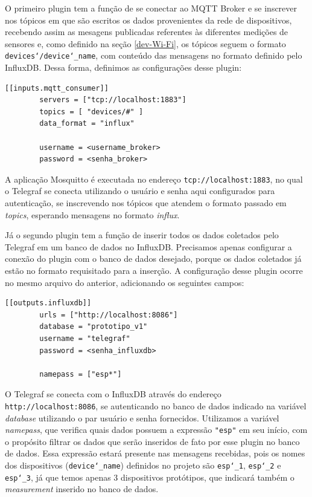 \documentclass[../monografia.tex]{subfiles}
\begin{document}
O primeiro plugin tem a função de se conectar ao MQTT Broker e se inscrever nos tópicos em que são escritos os dados provenientes da rede de dispositivos, recebendo assim as mesagens publicadas referentes às diferentes medições de sensores e, como definido na seção \ref{dev-Wi-Fi}, os tópicos seguem o formato \texttt{devices\char`/device\char`_name}, com conteúdo das mensagens no formato definido pelo InfluxDB. Dessa forma, definimos as configurações desse plugin:

\begin{lstlisting}[basicstyle=\small]
	[[inputs.mqtt_consumer]]
		servers = ["tcp://localhost:1883"]
		topics = [ "devices/#" ]
		data_format = "influx"

		username = <username_broker> 
		password = <senha_broker>
\end{lstlisting}

A aplicação Mosquitto é executada no endereço \texttt{tcp://localhost:1883}, no qual o Telegraf se conecta utilizando o usuário e senha aqui configurados para autenticação, se inscrevendo nos tópicos que atendem o formato passado em \textit{topics}, esperando mensagens no formato \textit{influx}. 

Já o segundo plugin tem a função de inserir todos os dados coletados pelo Telegraf em um banco de dados no InfluxDB. Precisamos apenas configurar a conexão do plugin com o banco de dados desejado, porque os dados coletados já estão no formato requisitado para a inserção. A configuração desse plugin ocorre no mesmo arquivo do anterior, adicionando os seguintes campos:

\begin{lstlisting}[basicstyle=\small]
	[[outputs.influxdb]]
		urls = ["http://localhost:8086"]
		database = "prototipo_v1"
		username = "telegraf"
		password = <senha_influxdb>

		namepass = ["esp*"]
\end{lstlisting}

O Telegraf se conecta com o InfluxDB através do endereço \texttt{http://localhost:8086}, se autenticando no banco de dados indicado na variável \textit{database} utilizando o par usuário e senha fornecidos. Utilizamos a variável \textit{namepass}, que verifica quais dados possuem a expressão \texttt{"esp"} em seu início, com o propósito filtrar os dados que serão inseridos de fato por esse plugin no banco de dados. Essa expressão estará presente nas mensagens recebidas, pois os nomes dos dispositivos (\texttt{device\char`_name}) definidos no projeto são \texttt{esp\char`_1}, \texttt{esp\char`_2} e \texttt{esp\char`_3}, já que temos apenas 3 dispositivos protótipos, que indicará também o \textit{measurement} inserido no banco de dados. 
\end{document}
